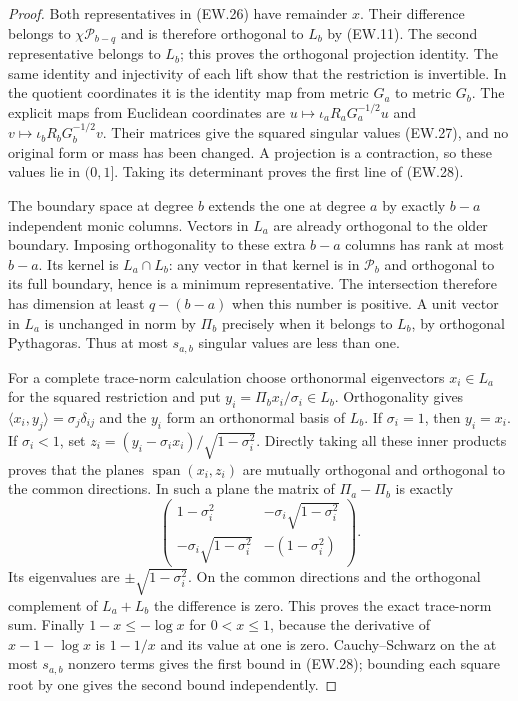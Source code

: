 \documentclass[11pt]{article}
\begin{document}
\begin{proof}
Both representatives in (EW.26) have remainder $x$. Their difference
belongs to $\chi\mathcal P_{b-q}$ and is therefore orthogonal to
$L_b$ by (EW.11). The second representative belongs to $L_b$;
this proves the orthogonal projection identity. The same identity
and injectivity of each lift show that the restriction is invertible.
In the quotient coordinates it is the identity map from metric
$G_a$ to metric $G_b$. The explicit maps from Euclidean coordinates
are $u\mapsto\iota_aR_aG_a^{-1/2}u$ and
$v\mapsto\iota_bR_bG_b^{-1/2}v$. Their matrices give the squared
singular values (EW.27), and no original form or mass has been
changed. A projection is a contraction, so these values lie in
$(0,1]$. Taking its determinant proves the first line of (EW.28).

The boundary space at degree $b$ extends the one at degree $a$ by
exactly $b-a$ independent monic columns. Vectors in $L_a$ are
already orthogonal to the older boundary. Imposing orthogonality to
these extra $b-a$ columns has rank at most $b-a$. Its kernel is
$L_a\cap L_b$: any vector in that kernel is in $\mathcal P_b$
and orthogonal to its full boundary, hence is a minimum representative.
The intersection therefore has dimension at least $q-(b-a)$ when
this number is positive. A unit vector in $L_a$ is unchanged in
norm by $\Pi_b$ precisely when it belongs to $L_b$, by orthogonal
Pythagoras. Thus at most $s_{a,b}$ singular values are less than one.

For a complete trace-norm calculation choose orthonormal eigenvectors
$x_i\in L_a$ for the squared restriction and put
$y_i=\Pi_bx_i/\sigma_i\in L_b$. Orthogonality gives
$\langle x_i,y_j\rangle=\sigma_j\delta_{ij}$ and the $y_i$
form an orthonormal basis of $L_b$. If $\sigma_i=1$, then
$y_i=x_i$. If $\sigma_i<1$, set
$z_i=(y_i-\sigma_ix_i)/\sqrt{1-\sigma_i^2}$.
Directly taking all these inner products proves that the planes
$\operatorname{span}(x_i,z_i)$ are mutually orthogonal and
orthogonal to the common directions. In such a plane the matrix of
$\Pi_a-\Pi_b$ is exactly
\[
 \begin{pmatrix}
 1-\sigma_i^2&-\sigma_i\sqrt{1-\sigma_i^2}\\
 -\sigma_i\sqrt{1-\sigma_i^2}&-(1-\sigma_i^2)
 \end{pmatrix}.
\]
Its eigenvalues are $\pm\sqrt{1-\sigma_i^2}$. On the common
directions and the orthogonal complement of $L_a+L_b$ the
difference is zero. This proves the exact trace-norm sum.
Finally $1-x\le-\log x$ for $0<x\le1$, because the
derivative of $x-1-\log x$ is $1-1/x$ and its value at one is
zero. Cauchy--Schwarz on the at most $s_{a,b}$ nonzero terms gives
the first bound in (EW.28); bounding each square root by one gives
the second bound independently.
\end{proof}
\end{document}
